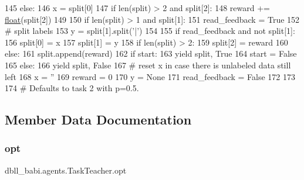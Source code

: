 \begin{DoxyCode}
145                     \textcolor{keywordflow}{else}:
146                         x = split[0]
147                 \textcolor{keywordflow}{if} len(split) > 2 \textcolor{keywordflow}{and} split[2]:
148                     reward += \hyperlink{namespaceprojects_1_1controllable__dialogue_1_1make__control__dataset_aa2b7207688c641dbc094ab44eca27113}{float}(split[2])
149 
150                 \textcolor{keywordflow}{if} len(split) > 1 \textcolor{keywordflow}{and} split[1]:
151                     read\_feedback = \textcolor{keyword}{True}
152                     \textcolor{comment}{# split labels}
153                     y = split[1].split(\textcolor{stringliteral}{'|'})
154 
155                 \textcolor{keywordflow}{if} read\_feedback \textcolor{keywordflow}{and} \textcolor{keywordflow}{not} split[1]:
156                     split[0] = x
157                     split[1] = y
158                     \textcolor{keywordflow}{if} len(split) > 2:
159                         split[2] = reward
160                     \textcolor{keywordflow}{else}:
161                         split.append(reward)
162                     \textcolor{keywordflow}{if} start:
163                         \textcolor{keywordflow}{yield} split, \textcolor{keyword}{True}
164                         start = \textcolor{keyword}{False}
165                     \textcolor{keywordflow}{else}:
166                         \textcolor{keywordflow}{yield} split, \textcolor{keyword}{False}
167                     \textcolor{comment}{# reset x in case there is unlabeled data still left}
168                     x = \textcolor{stringliteral}{''}
169                     reward = 0
170                     y = \textcolor{keywordtype}{None}
171                     read\_feedback = \textcolor{keyword}{False}
172 
173 
174 \textcolor{comment}{# Defaults to task 2 with p=0.5.}
\end{DoxyCode}


\subsection{Member Data Documentation}
\mbox{\label{classdbll__babi_1_1agents_1_1TaskTeacher_abe6872d5eda75ca8a15ecf4785086c48}} 
\subsubsection{\texorpdfstring{opt}{opt}}
{\footnotesize\ttfamily dbll\+\_\+babi.\+agents.\+Task\+Teacher.\+opt}



